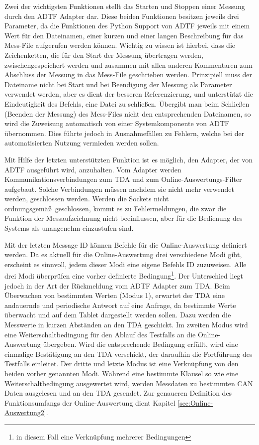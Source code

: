 \documentclass[12pt,a4paper]{report}
\begin{document}
Zwei der wichtigsten Funktionen stellt das Starten und Stoppen einer Messung durch den ADTF Adapter dar. Diese beiden Funktionen besitzen jeweils drei Parameter, da die Funktionen des Python Support von ADTF jeweils mit einem Wert für den Dateinamen, einer kurzen und einer langen Beschreibung für das Mess-File aufgerufen werden können. Wichtig zu wissen ist hierbei, dass die Zeichenketten, die für den Start der Messung übertragen werden, zwischengespeichert werden und zusammen mit allen anderen Kommentaren zum Abschluss der Messung in das Mess-File geschrieben werden. Prinzipiell muss der Dateiname nicht bei Start und bei Beendigung der Messung als Parameter verwendet werden, aber es dient der besseren Referenzierung, und unterstützt die Eindeutigkeit des Befehls, eine Datei zu schließen. Übergibt man beim Schließen (Beenden der Messung) des Mess-Files nicht den entsprechenden Dateinamen, so wird die Zuweisung automatisch von einer Systemkomponente von ADTF übernommen. Dies führte jedoch in Ausnahmefällen zu Fehlern, welche bei der automatisierten Nutzung vermieden werden sollen.

Mit Hilfe der letzten unterstützten Funktion ist es möglich, den Adapter, der von ADTF ausgeführt wird, anzuhalten. Vom Adapter werden Kommunikationsverbindungen zum TDA und zum Online-Auswertungs-Filter aufgebaut. Solche Verbindungen müssen nachdem sie nicht mehr verwendet werden, geschlossen werden. Werden die Sockets nicht ordnungsgemä\ss\ geschlossen, kommt es zu Fehlermeldungen, die zwar die Funktion der Messaufzeichnung nicht beeinflussen, aber für die Bedienung des Systems als unangenehm einzustufen sind.

Mit der letzten Message ID können Befehle für die Online-Auswertung definiert werden. Da es aktuell für die Online-Auswertung drei verschiedene Modi gibt, erscheint es sinnvoll, jedem dieser Modi eine eigene Befehls ID zuzuweisen. Alle drei Modi überprüfen eine vorher definierte Bedingung\footnote{in diesem Fall eine Verknüpfung mehrerer Bedingungen}. Der Unterschied liegt jedoch in der Art der Rück\-mel\-dung vom ADTF Adapter zum TDA. Beim Überwachen von bestimmten Werten (Modus 1), erwartet der TDA eine andauernde und periodische Antwort auf eine Anfrage, da bestimmte Werte überwacht und auf dem Tablet dargestellt werden sollen. Dazu werden die Messwerte in kurzen Abständen an den TDA geschickt. Im zweiten Modus wird eine Weiterschaltbedingung für den Ablauf des Testfalls an die Online-Auswertung übergeben. Wird die entsprechende Bedingung erfüllt, wird eine einmalige Bestätigung an den TDA verschickt, der daraufhin die Fortführung des Testfalls einleitet. Der dritte und letzte Modus ist eine Verknüpfung von den beiden vorher genannten Modi. Während eine bestimmte Klausel so wie eine Weiterschaltbedingung ausgewertet wird, werden Messdaten zu bestimmten CAN Daten ausgelesen und an den TDA gesendet. Zur genaueren Definition des Funktionsumfangs der Online-Auswertung dient Kapitel \ref{sec:Online-Auswertung2}.
\end{document}
